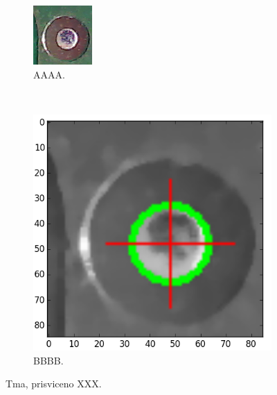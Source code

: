 \begin{figure}[h!]
	\centering
	\begin{subfigure}[b]{0.4\textwidth}
		\centering
		\includegraphics[width=0.4\linewidth, trim = 0cm -1.5cm 0cm 0cm]{obrazky/fiduc_tma_prisviceno_crop.png}%
		\caption{AAAA.}
		\label{fig:tma}
	\end{subfigure}
	~
	\begin{subfigure}[b]{0.4\textwidth}
		\centering
		\includegraphics[width=0.9\linewidth]{obrazky/fiduc_tma_prisviceno_crop3.png}%
		\caption{BBBB.}
		\label{fig:tma2}
	\end{subfigure}

	\caption{Tma, prisviceno XXX.}
\end{figure}

